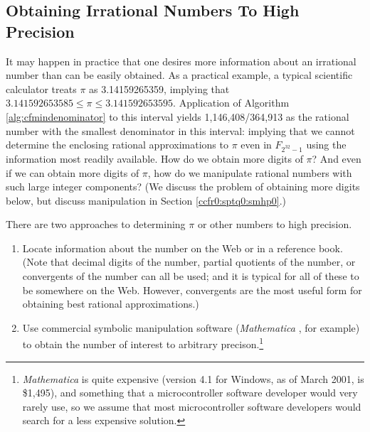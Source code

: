 \subsection{Obtaining Irrational Numbers To High Precision}
\label{ccfr0:sptq0:ssoin0}

It may happen in practice that one desires more information about an
irrational number than can be easily obtained.  As a practical example,
a typical scientific calculator treats $\pi$ as 3.14159265359, implying that 
$3.141592653585 \leq \pi \leq 3.141592653595$.  Application of 
Algorithm \cfryzeroxrefhyphen{}\ref{alg:cfmindenominator} to this
interval yields 1,146,408/364,913 as the rational number with the
smallest denominator in this interval:  implying that we cannot determine the 
enclosing rational approximations to $\pi$ even in $F_{2^{32}-1}$ using
the information most readily available.  How do we obtain more digits of $\pi$?
And even if we can obtain more digits of $\pi$, how do we manipulate rational
numbers with such large integer components?  (We discuss the problem of obtaining
more digits below, but discuss manipulation in Section \ref{ccfr0:sptq0:smhp0}.)

There are two approaches to determining $\pi$ or other numbers to
high precision.

\begin{enumerate}

\item Locate information about the number on the Web or in a reference
      book.  (Note that decimal digits of the number, partial quotients
	  of the number, or convergents of the number can all be used; and it
	  is typical for all of these to be somewhere on the Web.  However,
	  convergents are the most useful form for obtaining best rational
	  approximations.)

\item Use commercial symbolic manipulation software (\emph{Mathematica}
      \cite{bibref:s:wolframmathematica}, 
      for example) to
      obtain the number of interest to arbitrary 
      precison.\footnote{\label{footnote:ccfr0:sptq0:ssoin0:mathematicaexpensive}\emph{Mathematica}
      \cite{bibref:s:wolframmathematica} is quite expensive (version 4.1 
      for Windows, as of March 2001, is \$1,495), 
      and something that a microcontroller software developer
      would very rarely use, so we assume that most microcontroller software
      developers would search for a less expensive solution.}

\end{enumerate}

